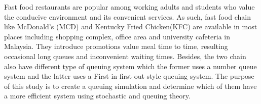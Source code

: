 Fast food restaurants are popular among working adults and students who value the conducive environment and its convenient services. As such, fast food chain like McDonald's (MCD) and Kentucky Fried Chicken(KFC) are available in most places including shopping complex, office area and university cafeteria in Malaysia. They introduce promotions value meal time to time, resulting occasional long queues and inconvenient waiting times. Besides, the two chain also have different type of queuing system which the former uses a number queue system and the latter uses a First-in-first out style queuing system. The purpose of this study is to create a queuing simulation and determine which of them have a more efficient system using stochastic and queuing theory.
